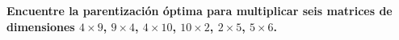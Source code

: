 \textbf{Encuentre la parentización óptima para multiplicar seis matrices de dimensiones $4 \times 9$, $9 \times 4$, $4 \times 10$, $10 \times 2$, $2 \times 5$, $5 \times 6$.}\vspace{.2cm}

\textcolor{bibi}{}
\begin{quote}
\end{quote}